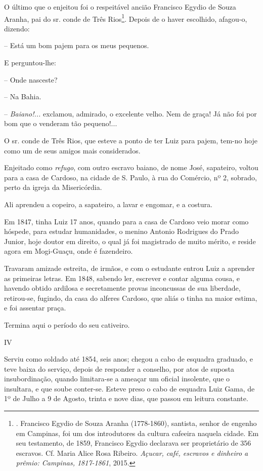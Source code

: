 O último que o enjeitou foi o respeitável ancião Francisco Egydio de
Souza Aranha, pai do sr. conde de Três Rios\footnote{. Francisco Egydio
  de Souza Aranha (1778-1860), santista, senhor de engenho em Campinas,
  foi um dos introdutores da cultura cafeeira naquela cidade. Em seu
  testamento, de 1859, Francisco Egydio declarava ser proprietário de
  356 escravos. Cf. Maria Alice Rosa Ribeiro. \emph{Açucar, café,
  escravos e dinheiro a prêmio: Campinas, 1817-1861}, 2015.}. Depois de
o haver escolhido, afagou-o, dizendo:

-- Está um bom pajem para os meus pequenos.

E perguntou-lhe:

-- Onde nasceste?

-- Na Bahia.

-- \emph{Baiano!...} exclamou, admirado, o excelente velho. Nem de
graça! Já não foi por bom que o venderam tão pequeno!...

O sr. conde de Três Rios, que esteve a ponto de ter Luiz para pajem,
tem-no hoje como um de seus amigos mais considerados.

Enjeitado como \emph{refugo}, com outro escravo baiano, de nome José,
sapateiro, voltou para a casa de Cardoso, na cidade de S. Paulo, à rua
do Comércio, nº 2, sobrado, perto da igreja da Misericórdia.

Ali aprendeu a copeiro, a sapateiro, a lavar e engomar, e a costura.

Em 1847, tinha Luiz 17 anos, quando para a casa de Cardoso veio morar
como hóspede, para estudar humanidades, o menino Antonio Rodrigues do
Prado Junior, hoje doutor em direito, o qual já foi magistrado de muito
mérito, e reside agora em Mogi-Guaçu, onde é fazendeiro.

Travaram amizade estreita, de irmãos, e com o estudante entrou Luiz a
aprender as primeiras letras. Em 1848, sabendo ler, escrever e contar
alguma cousa, e havendo obtido ardilosa e secretamente provas
inconcussas de sua liberdade, retirou-se, fugindo, da casa do alferes
Cardoso, que aliás o tinha na maior estima, e foi assentar praça.

Termina aqui o período do seu cativeiro.

IV

Serviu como soldado até 1854, seis anos; chegou a cabo de esquadra
graduado, e teve baixa do serviço, depois de responder a conselho, por
atos de suposta insubordinação, quando limitara-se a ameaçar um oficial
insolente, que o insultara, e que soube conter-se. Esteve preso o cabo
de esquadra Luiz Gama, de 1º de Julho a 9 de Agosto, trinta e nove dias,
que passou em leitura constante.

